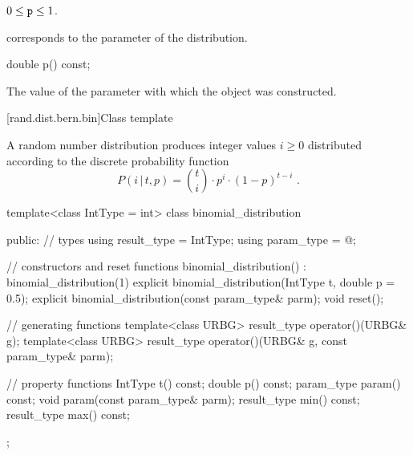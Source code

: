 \begin{itemdescr}
\pnum
\expects
$0 \leq \texttt{p} \leq 1$.

\pnum
\remarks
 corresponds to the parameter of the distribution.
\end{itemdescr}

%
\begin{itemdecl}
double p() const;
\end{itemdecl}

\begin{itemdescr}
\pnum
\returns
The value of the  parameter
 with which the object was constructed.
\end{itemdescr}


[rand.dist.bern.bin]{Class template }%
%
%

\pnum
A  random number distribution
produces integer values $i \geq 0$
distributed according to
the discrete probability function%
%
%
\[ P(i\,|\,t,p) = \binom{t}{i} \cdot p^i \cdot (1-p)^{t-i} \text{ .} \]

%
%
\begin{codeblock}
template<class IntType = int>
  class binomial_distribution {
  public:
    // types
    using result_type = IntType;
    using param_type  = @\unspec@;

    // constructors and reset functions
    binomial_distribution() : binomial_distribution(1) {}
    explicit binomial_distribution(IntType t, double p = 0.5);
    explicit binomial_distribution(const param_type& parm);
    void reset();

    // generating functions
    template<class URBG>
      result_type operator()(URBG& g);
    template<class URBG>
      result_type operator()(URBG& g, const param_type& parm);

    // property functions
    IntType t() const;
    double p() const;
    param_type param() const;
    void param(const param_type& parm);
    result_type min() const;
    result_type max() const;
  };
\end{codeblock}



